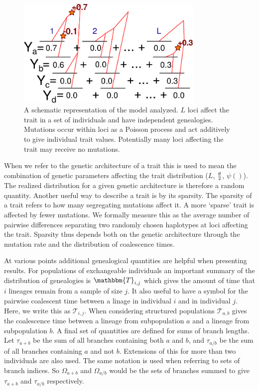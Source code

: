 \begin{figure}
  \centering
  \includegraphics[width=0.8\textwidth]{figures/schema.pdf}
  \caption{A schematic representation of the model analyzed.
  $L$ loci affect the trait in a set of individuals and have independent
  genealogies. Mutations occur within loci as a Poisson process and act
  additively to give individual trait values. Potentially many loci affecting
  the trait may receive no mutations.}
  \label{fig:schema}
\end{figure}

When we refer to the genetic architecture of a trait this is used to mean the
combination of genetic parameters affecting the trait distribution ($L$, $\frac{\theta}{2}$,
$\psi()$). The realized distribution for a given genetic architecture is
therefore a random quantity. Another useful way to describe a trait is by its
sparsity. The sparsity of a trait refers to how many segregating mutations
affect it. A more `sparse' trait is affected by fewer mutations. We formally
measure this as the average number of pairwise differences separating two
randomly chosen haplotypes at loci affecting the trait. Sparsity thus depends
both on the genetic architecture through the mutation rate and the distribution
of coalescence times.

At various points additional genealogical quantities are helpful when presenting
results. For populations of exchangeable individuals an important summary of the
distribution of genealogies is $\mathbbm{T}_{i,j}$ which gives the amount of
time that $i$ lineages remain from a sample of size $j$. It also useful to have
a symbol for the pairwise coalescent time between a linage in individual $i$ and
in individual $j$. Here, we write this as $\mathcal{T}_{i,j}$. When considering
structured populations $\mathcal{T}_{a,b}$ gives the coalescence time between a
lineage from subpopulation $a$ and a lineage from subpopulation $b$. A final set
of quantities are defined for sums of branch lengths. Let $\tau_{a+b}$ be the
sum of all branches containing both $a$ and $b$, and $\tau_{a/b}$ be the sum of
all branches containing $a$ and not $b$. Extensions of this for more than two
individuals are also used. The same notation is used when referring to sets of
branch indices. So $\Omega_{a+b}$ and $\Omega_{a/b}$ would be the sets of
branches summed to give $\tau_{a+b}$ and $\tau_{a/b}$ respectively.


